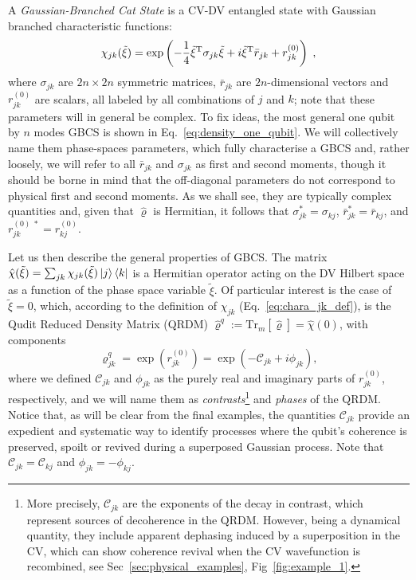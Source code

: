 \documentclass[%
reprint,
superscriptaddress,
nofootinbib,
 amsmath,amssymb,
prx,
floatfix,
]{revtex4-2}
\begin{document}
 A \textit{Gaussian-Branched Cat State} is a CV-DV entangled state with Gaussian branched characteristic functions:
\begin{equation}
\label{eq:chara_jk}
    \chi_{jk} (\tilde{\xi}) =  \exp \left( -\frac{1}{4} \tilde{\xi}^{\rm T} \sigma_{jk} \tilde{\xi}  +  i  \tilde{\xi}^{\rm T} \bar{r}_{jk} + r^{(0)}_{jk}   \right) \;,
\end{equation}
where $\sigma_{jk}$ are $2n\times 2n$ symmetric matrices, $\bar{r}_{jk}$ are $2n$-dimensional vectors and  $r^{(0)}_{jk} $ are scalars, all labeled by all combinations of $j$ and $k$; note that these parameters will in general be complex. To fix ideas, the most general one qubit by $n$ modes GBCS is shown in Eq.~\ref{eq:density_one_qubit}. We will collectively name them phase-spaces parameters, which fully characterise a GBCS and, rather loosely, we will refer to all $\bar{r}_{jk}$ and $\sigma_{jk}$ as first and second moments, though it should be borne in mind that the off-diagonal parameters do not correspond to physical first and second moments. As we shall see, they are typically complex quantities and, given that $\hat{\varrho}$ is Hermitian, it follows that $\sigma_{jk}^* = \sigma_{kj}$, $\bar{r}_{jk}^* = \bar{r}_{kj}$, and $r_{jk}^{(0)\; *} = r_{kj}^{(0)}$.  

Let us then describe the general properties of GBCS. The matrix $\hat{\chi} (\tilde{\xi} ) = \sum_{jk}\chi_{jk} (\tilde{\xi} ) \ket{j} \bra{k}$ is a Hermitian operator acting on the DV Hilbert space as a function of the phase space variable $\tilde{\xi}$. Of particular interest is the case of $\tilde{\xi} = 0$, which, according to the definition of $\chi_{jk}$ (Eq.~\ref{eq:chara_jk_def}), is the Qudit Reduced Density Matrix (QRDM) $\hat{\varrho}^{q} := \text{Tr}_m [\hat{\varrho}] = \hat{\chi} (0) $, with components
\begin{equation}
     \varrho^{q}_{jk} = \exp(r^{(0)}_{jk}) = \exp \left(- \mathcal{C}_{jk} + i  \phi_{jk} \right),
\end{equation}
where we defined $\mathcal{C}_{jk}$ and $ \phi_{jk} $ as the purely real and imaginary parts of $r^{(0)}_{jk}$, respectively, and we will name them as \textit{contrasts}\footnote{More precisely, $\mathcal{C}_{jk}$ are the exponents of the decay in contrast, which represent sources of decoherence in the QRDM. However, being a dynamical quantity, they include apparent dephasing induced by a superposition in the CV, which can show coherence revival when the CV wavefunction is recombined, see Sec~\ref{sec:physical_examples}, Fig~\ref{fig:example_1}.} and \textit{phases} of the QRDM. Notice that, as will be clear from the final examples, the quantities $\mathcal{C}_{jk}$ provide an expedient and systematic way to identify processes where the qubit's coherence is preserved, spoilt or revived during a superposed Gaussian process. Note that  $\mathcal{C}_{jk} = \mathcal{C}_{kj}$ and $\phi_{jk} = -\phi_{kj}$.
\end{document}
